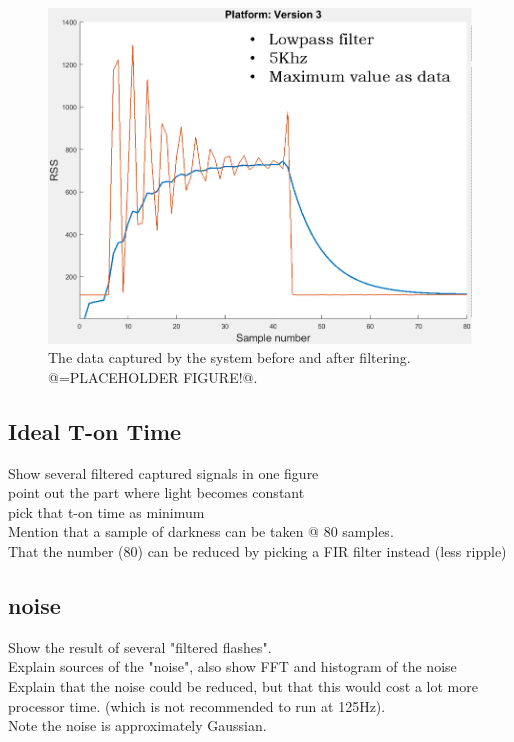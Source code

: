 \begin{figure}[!h]
	\includegraphics[width=\textwidth]{pics/66KhzFilter_placeholder.png}
	\caption{The data captured by the system before and after filtering. @=PLACEHOLDER FIGURE!@.}
	\label{fig:66KhzFilter}
\end{figure}

\subsection{Ideal T-on Time}
\label{subsec:T-on_Time}
Show several filtered captured signals in one figure\\
point out the part where light becomes constant\\
pick that t-on time as minimum\\
Mention that a sample of darkness can be taken @ 80 samples.\\
That the number (80) can be reduced by picking a FIR filter instead (less ripple)\\

\subsection{noise}
\label{subsec:noise}
Show the result of several "filtered flashes".\\
Explain sources of the "noise", also show FFT and histogram of the noise\\
Explain that the noise could be reduced, but that this would cost a lot more processor time. (which is not recommended to run at 125Hz).\\
Note the noise is approximately Gaussian.

